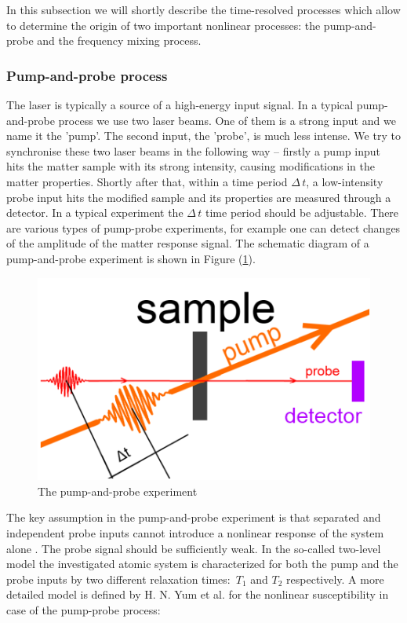 \documentclass[12pt,twoside,a4paper]{article}
\numberwithin{equation}{subsection}
\numberwithin{figure}{subsection}
\begin{document}
In this subsection we will shortly describe the time-resolved processes which allow to determine the origin of two important nonlinear processes: the pump-and-probe and the frequency mixing process.

\subsubsection*{Pump-and-probe process} \label{chap:physical_pnp}

The laser is typically a source of a high-energy input signal. In a typical pump-and-probe process we use two laser beams. One of them is a strong input and we name it the 'pump'. The second input, the 'probe', is much less intense. We try to synchronise these two laser beams in the following way -- firstly a pump input hits the matter sample with its strong intensity, causing modifications in the matter properties. Shortly after that, within a time period $\Delta \, t$, a low-intensity probe input hits the modified sample and its properties are measured through a detector. In a typical experiment the $\Delta \, t$ time period should be adjustable. There are various types of pump-probe experiments, for example one can detect changes of the amplitude of the matter response signal. The schematic diagram of a pump-and-probe experiment is shown in Figure (\ref{fig:physical_pnp_fig}).

\begin{figure} 
	\begin{center}
		\includegraphics{img/pnp.png}
		\caption{The pump-and-probe experiment\label{fig:physical_pnp_fig}}
	\end{center}
\end{figure}

The key assumption in the pump-and-probe experiment is that separated and independent probe inputs cannot introduce a nonlinear response of the system alone \cite{boyd_nlo}. The probe signal should be sufficiently weak. In the so-called two-level model the investigated atomic system is characterized for both the pump and the probe inputs by two different relaxation times:~${T_{1}}$  and ${T_{2}}$ respectively. A more detailed model is defined by H. N. Yum et al. \cite{yum_pump} for the nonlinear susceptibility in case of the pump-probe process:
\end{document}
